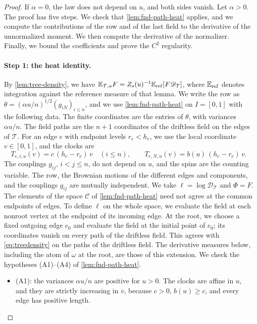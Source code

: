 \begin{proof}
If $\alpha=0$, the law does not depend on $u$, and both sides vanish. Let
$\alpha>0$. The proof has five steps. We check
that \cref{lem:fnd-path-heat} applies, and we compute the contributions
of the row and of the last field to the derivative of the unnormalized
moment. We then compute the derivative of the normalizer. Finally, we
bound the coefficients and prove the $C^2$ regularity.

\paragraph{Step 1: the heat identity.}
By \cref{lem:tree-density}, we have
$\mathbb E_{\mathcal T,u}F=Z_s(u)^{-1}\mathbb E_{\rm ref}[F\mathscr D_{\mathcal T}]$,
where $\mathbb E_{\rm ref}$ denotes integration against the reference measure of
that lemma. We write the row as $\theta=(\alpha u/n)^{1/2}(g_{iN})_{i\le n}$,
and we use \cref{lem:fnd-path-heat} on $I=[0,1]$ with the following
data. The finite coordinates are the entries of $\theta$, with variances
$\alpha u/n$. The field paths are the $n+1$ coordinates of the driftless
field on the edges of $\mathcal T$. For an edge $e$ with endpoint levels
$r_e<h_e$, we use the local coordinate $v\in[0,1]$, and the clocks are
\[
 T_{e,i,u}(v)=c\,(h_e-r_e)\,v\quad(i\le n),\qquad
 T_{e,N,u}(v)=b(u)\,(h_e-r_e)\,v .
\]
The couplings $g_{ij}$, $i<j\le n$, do not depend on $u$, and the spins
are the counting variable. The row, the Brownian motions of the
different edges and components, and the couplings $g_{ij}$ are mutually
independent. We take $\ell=\log\mathscr D_{\mathcal T}$ and
$\Phi=F$. The elements of the space $\mathcal C$ of
\cref{lem:fnd-path-heat} need not agree at the common
endpoints of edges. To define $\ell$ on the whole space, we evaluate the field at each nonroot vertex at the
endpoint of its incoming edge. At the root, we choose a fixed outgoing
edge $e_0$ and evaluate the field at the initial point of $e_0$; its
coordinates vanish on every path of the driftless field. This agrees with
\eqref{eq:treedensity} on the paths of the driftless field. The
derivative measures below, including the atom of $\omega$ at the root,
are those of this extension. We check the hypotheses \textup{(A1)}--\textup{(A4)} of
\cref{lem:fnd-path-heat}.
\begin{itemize}
\item \textup{(A1)}: the variances $\alpha u/n$ are positive for $u>0$.
The clocks are affine in $u$, and they are strictly increasing in $v$,
because $c>0$, $b(u)\ge c$, and every edge has positive length.

\end{itemize}
\end{proof}
